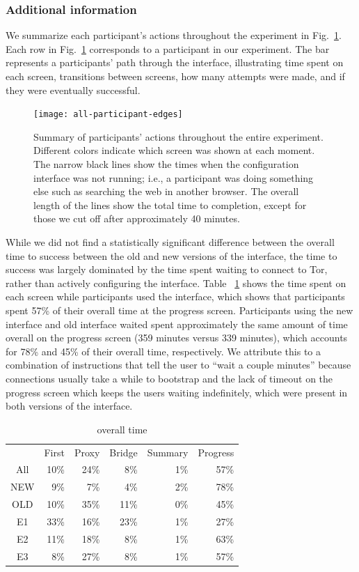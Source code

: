 \documentclass[USenglish,oneside,twocolumn]{article}
\begin{document}
\subsubsection{Additional information} 
We summarize each participant's actions throughout the experiment in Fig.~\ref{fig:all-participant-edges}. Each row in Fig.~\ref{fig:all-participant-edges} corresponds to a participant in our experiment. The bar represents a participants' path through the interface, illustrating time spent on each screen, transitions between screens, how many attempts were made, and if they were eventually successful. 

\begin{figure}
\centering
\texttt{[image: all-participant-edges]}
\caption{
Summary of participants' actions throughout the entire experiment.
Different colors indicate which screen was shown at each moment.
The narrow black lines show the times when the configuration interface
was not running; i.e., a participant was doing something else
such as searching the web in another browser.
The overall length of the lines show the total time to completion,
except for those we cut off after approximately 40 minutes.
}
\label{fig:all-participant-edges}
\end{figure}

While we did not find a statistically significant difference between the overall time to success between the old and new versions of the interface, the time to success was largely dominated by the time spent waiting to connect to Tor, rather than actively configuring the interface. Table ~\ref{table:overall_time} shows the time spent on each screen while participants used the interface, which shows that participants spent 57\% of their overall time at the progress screen. Participants using the new interface and old interface waited spent approximately the same amount of time overall on the progress screen (359 minutes versus 339 minutes), which accounts for 78\% and 45\% of their overall time, respectively. We attribute this to a combination of instructions that tell the user to ``wait a couple minutes'' because connections usually take a while to bootstrap and the lack of timeout on the progress screen which keeps the users waiting indefinitely, which were present in both versions of the interface. 

\begin{table}
\centering
	\begin{tabular}{c r r r r r}
	 & First & Proxy & Bridge & Summary & Progress \\
	\noalign{\hrule}
	All &  10\% & 24\% & 8\% & 1\% & 57\% \\
	NEW & 9\% & 7\% & 4\% & 2\% &  78\% \\
	OLD & 10\% & 35\% & 11\% & 0\% & 45\% \\
	E1 & 33\% & 16\% & 23\% & 1\% & 27\% \\
	E2 & 11\% & 18\% & 8\% & 1\% & 63\% \\
	E3 & 8\% & 27\% & 8\% & 1\% & 57\% \\
	\end{tabular}
\caption{overall time} 
\label{table:overall_time}
\end{table}
\end{document}
